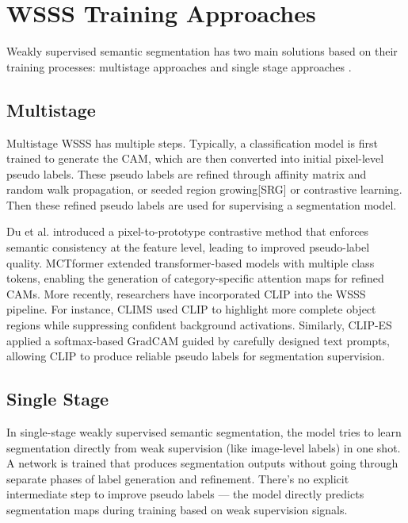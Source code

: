 \section{WSSS Training Approaches}
\label{sec:stages}

Weakly supervised semantic segmentation has two main solutions based on their training processes: multistage approaches \cite{instance_wsss,wsss_L2G,wsss_rib} and single stage approaches \cite{wsss_reliability_does_matter, wsss_afa_affinity_from_attention}.

\subsection{Multistage}
\label{subsec:multi-stage}

Multistage WSSS has multiple steps. Typically, a classification model is first trained to generate the CAM,  which are then converted into initial pixel-level pseudo labels. These pseudo labels are refined through affinity matrix and random walk propagation\cite{wsss_affinitynet, wsss_afa_affinity_from_attention}, or seeded region growing[SRG] or contrastive learning. Then these refined pseudo labels are used for supervising a segmentation model.

Du et al. \cite{pixel_to_prototype} introduced a pixel-to-prototype contrastive method that enforces semantic consistency at the feature level, leading to improved pseudo-label quality. MCTformer \cite{wsss_MCTformer} extended transformer-based models with multiple class tokens, enabling the generation of category-specific attention maps for refined CAMs. More recently, researchers have incorporated CLIP into the WSSS pipeline. For instance, CLIMS \cite{wsss_clims} used CLIP to highlight more complete object regions while suppressing confident background activations. Similarly, CLIP-ES \cite{wsss_clip_es} applied a softmax-based GradCAM \cite{cam_grad} guided by carefully designed text prompts, allowing CLIP to produce reliable pseudo labels for segmentation supervision.

\subsection{Single Stage}
\label{subsec:single-stage}

In single-stage weakly supervised semantic segmentation, the model tries to learn segmentation directly from weak supervision (like image-level labels) in one shot. A network is trained that produces segmentation outputs without going through separate phases of label generation and refinement. There's no explicit intermediate step to improve pseudo labels — the model directly predicts segmentation maps during training based on weak supervision signals.

